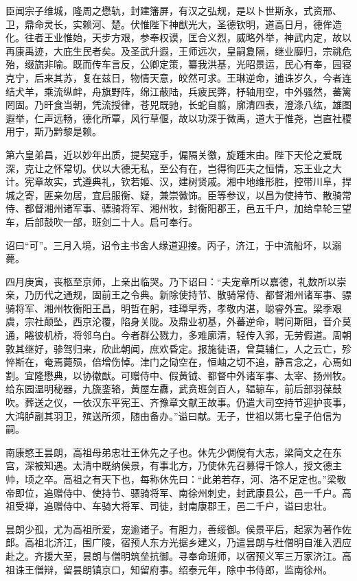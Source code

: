 \documentclass[]{article}
\begin{document}
臣闻宗子维城，隆周之懋轨，封建籓屏，有汉之弘规，是以卜世斯永，式资邢、卫，鼎命灵长，实赖河、楚。伏惟陛下神猷光大，圣德钦明，道高日月，德侔造化。往者王业惟始，天步方艰，参奉权谟，匡合义烈，威略外举，神武内定，故以再康禹迹，大庇生民者矣。及圣武升遐，王师远次，皇嗣夐隔，继业靡归，宗祧危殆，缀旒非喻。既而传车言反，公卿定策，纂我洪基，光昭景运，民心有奉，园寝克宁，后来其苏，复在兹日，物情天意，皎然可求。王琳逆命，逋诛岁久，今者连结犬羊，乘流纵衅，舟旗野阵，绵江蔽陆，兵疲民弊，杼轴用空，中外骚然，蕃篱罔固。乃旰食当朝，凭流授律，苍兕既驰，长蛇自翦，廓清四表，澄涤八纮，雄图遐举，仁声远畅，德化所覃，风行草偃，故以功深于微禹，道大于惟尧，岂直社稷用宁，斯乃黔黎是赖。

第六皇弟昌，近以妙年出质，提契寇手，偏隔关徼，旋踵末由。陛下天伦之爱既深，克让之怀常切。伏以大德无私，至公有在，岂得徇匹夫之恒情，忘王业之大计。宪章故实，式遵典礼，钦若姬、汉，建树贤戚。湘中地维形胜，控带川阜，捍城之寄，匪亲勿居，宜启服衡、疑，兼崇徽饰。臣等参议，以昌为使持节、散骑常侍、都督湘州诸军事、骠骑将军、湘州牧，封衡阳郡王，邑五千户，加给皁轮三望车，后部鼓吹一部，班剑二十人。启可奉行。

诏曰``可''。三月入境，诏令主书舍人缘道迎接。丙子，济江，于中流船坏，以溺薨。

四月庚寅，丧柩至京师，上亲出临哭。乃下诏曰：``夫宠章所以嘉德，礼数所以崇亲，乃历代之通规，固前王之令典。新除使持节、散骑常侍、都督湘州诸军事、骠骑将军、湘州牧衡阳王昌，明哲在躬，珪璋早秀，孝敬内湛，聪睿外宣。梁季艰虞，宗社颠坠，西京沦覆，陷身关陇。及鼎业初基，外蕃逆命，聘问斯阻，音介莫通，睠彼机桥，将邻乌白。今者群公戮力，多难廓清，轻传入郛，无劳假道。周朝敦其继好，骖驾归来，欣此朝闻，庶欢昏定。报施徒语，曾莫辅仁，人之云亡，殄悴斯在，奄焉薨殒，倍增伤悼。津门之恸空在，恒岫之切不追，静言念之，心焉如割。宜隆懋典，以协徽猷。可赠侍中、假黄钺、都督中外诸军事、太宰、扬州牧。给东园温明秘器，九旒銮辂，黄屋左纛，武贲班剑百人，辒辌车，前后部羽葆鼓吹。葬送之仪，一依汉东平宪王、齐豫章文献王故事。仍遣大司空持节迎护丧事，大鸿胪副其羽卫，殡送所须，随由备办。''谥曰献。无子，世祖以第七皇子伯信为嗣。

南康愍王昙朗，高祖母弟忠壮王休先之子也。休先少倜傥有大志，梁简文之在东宫，深被知遇。太清中既纳侯景，有事北方，乃使休先召募得千馀人，授文德主帅，顷之卒。高祖之有天下也，每称休先曰：``此弟若存，河、洛不足定也。''梁敬帝即位，追赠侍中、使持节、骠骑将军、南徐州刺史，封武康县公，邑一千户。高祖受禅，追赠侍中、车骑大将军、司徒，封南康郡王，邑二千户，谥曰忠壮。

昙朗少孤，尤为高祖所爱，宠逾诸子。有胆力，善绥御。侯景平后，起家为著作佐郎。高祖北济江，围广陵，宿预人东方光据乡建义，乃遣昙朗与杜僧明自淮入泗应赴之。齐援大至，昙朗与僧明筑垒抗御。寻奉命班师，以宿预义军三万家济江。高祖诛王僧辩，留昙朗镇京口，知留府事。绍泰元年，除中书侍郎，监南徐州。
\end{document}
